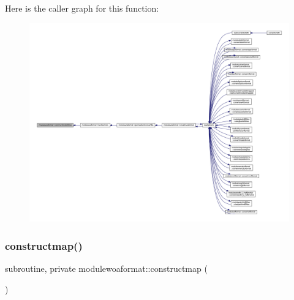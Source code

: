 Here is the caller graph for this function\+:\nopagebreak
\begin{figure}[H]
\begin{center}
\leavevmode
\includegraphics[width=350pt]{namespacemodulewoaformat_abe5b46fe3452046bddc33fbef20098f7_icgraph}
\end{center}
\end{figure}
\mbox{\label{namespacemodulewoaformat_a5db9ab670b36026be5980f95935f64f6}} 
\subsubsection{\texorpdfstring{constructmap()}{constructmap()}}
{\footnotesize\ttfamily subroutine, private modulewoaformat\+::constructmap (\begin{DoxyParamCaption}{ }\end{DoxyParamCaption})\hspace{0.3cm}{\ttfamily [private]}}

